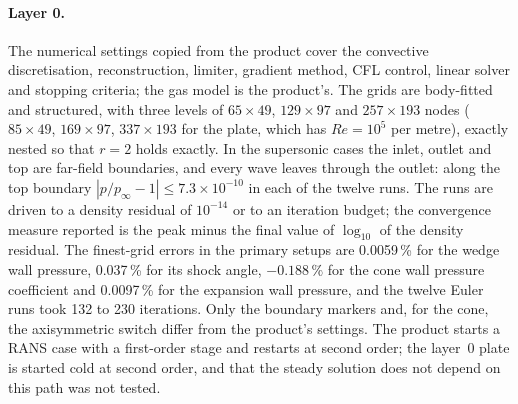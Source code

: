 \documentclass[twocolumn]{labreport}
\newcommand{\pinf}{p_\infty}
\begin{document}
\paragraph{Layer 0.}
The numerical settings copied from the product cover the convective discretisation, reconstruction, limiter, gradient method, CFL control, linear solver and stopping criteria; the gas model is the product's.
The grids are body-fitted and structured, with three levels of $65\times49$, $129\times97$ and $257\times193$ nodes ($85\times49$, $169\times97$, $337\times193$ for the plate, which has $Re=10^5$ per metre), exactly nested so that $r=2$ holds exactly.
In the supersonic cases the inlet, outlet and top are far-field boundaries, and every wave leaves through the outlet: along the top boundary $|p/\pinf-1|\le7.3\times10^{-10}$ in each of the twelve runs.
The runs are driven to a density residual of $10^{-14}$ or to an iteration budget; the convergence measure reported is the peak minus the final value of $\log_{10}$ of the density residual.
The finest-grid errors in the primary setups are 0.0059\,\% for the wedge wall pressure, 0.037\,\% for its shock angle, $-0.188\,\%$ for the cone wall pressure coefficient and 0.0097\,\% for the expansion wall pressure, and the twelve Euler runs took 132 to 230 iterations.
Only the boundary markers and, for the cone, the axisymmetric switch differ from the product's settings.
The product starts a RANS case with a first-order stage and restarts at second order; the layer~0 plate is started cold at second order, and that the steady solution does not depend on this path was not tested.
\end{document}

